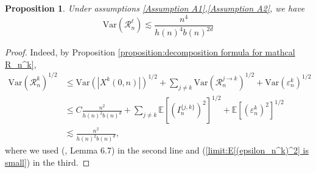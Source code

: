 \documentclass[10pt,a4paper]{amsart}
\newcommand{\R}{\mathcal R}
\newcommand{\EE}{\mathbb E}
\newcommand{\1}{\mathds{1}}
\newcommand{\Var}{\mathrm{Var}}
\newtheorem{proposition}{Proposition}
\numberwithin{equation}{section}
\begin{document}
\begin{proposition}
    Under assumptions \ref{Assumption A1},\ref{Assumption A2}, we have
    \begin{equation*}
        \Var\left(\R_n^{\ell}\right)\lesssim\frac{n^4}{h(n)^4b(n)^{2d}}
    \end{equation*}
\end{proposition}
\begin{proof}
    Indeed, by Proposition \ref{proposition:decomposition formula for mathcal R_n^k},
    \begin{align*}
        \Var\left(\R_n^k\right)^{1/2}&\le \Var\left(\left|X^k(0,n)\right|\right)^{1/2}+\sum_{j\ne k}\Var\left(\R_n^{j\rightarrow k}\right)^{1/2}+\Var\left(\varepsilon_n^k\right)^{1/2}\\
        &\le C\frac{n^2}{h(n)^2b(n)^d}+\sum_{j\ne k}\EE\left[\left(I_n^{\{j,k\}}\right)^2\right]^{1/2}+\EE\left[\left(\varepsilon_n^k\right)^2\right]^{1/2}\\
        &\lesssim\frac{n^2}{h(n)^2b(n)^d},
    \end{align*}
    where we used (\cite{LeGallRosenRangeOfStableRandomWalks1991}, Lemma 6.7) in the second line and (\ref{limit:E[(epsilon_n^k)^2] is small}) in the third.
\end{proof}
\end{document}
